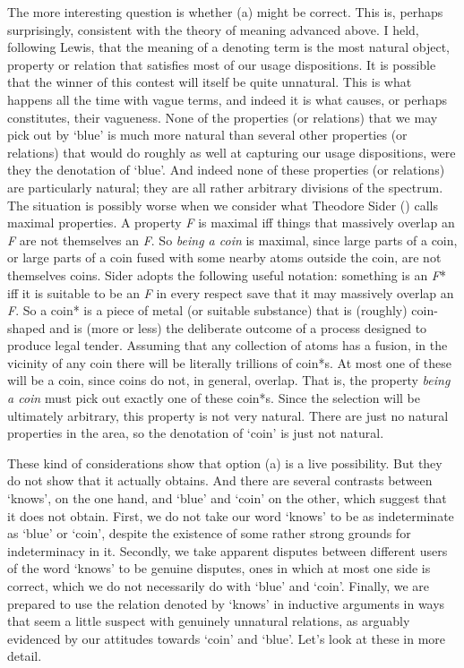\documentclass[
  11pt,
  letterpaper,
  DIV=11,
  numbers=noendperiod,
  oneside]{scrartcl}
\begin{document}
The more interesting question is whether (a) might be correct. This is,
perhaps surprisingly, consistent with the theory of meaning advanced
above. I held, following Lewis, that the meaning of a denoting term is
the most natural object, property or relation that satisfies most of our
usage dispositions. It is possible that the winner of this contest will
itself be quite unnatural. This is what happens all the time with vague
terms, and indeed it is what causes, or perhaps constitutes, their
vagueness. None of the properties (or relations) that we may pick out by
`blue' is much more natural than several other properties (or relations)
that would do roughly as well at capturing our usage dispositions, were
they the denotation of `blue'. And indeed none of these properties (or
relations) are particularly natural; they are all rather arbitrary
divisions of the spectrum. The situation is possibly worse when we
consider what Theodore Sider ()
calls maximal properties. A property \emph{F} is maximal iff things that
massively overlap an \emph{F} are not themselves an \emph{F}. So
\emph{being a coin} is maximal, since large parts of a coin, or large
parts of a coin fused with some nearby atoms outside the coin, are not
themselves coins. Sider adopts the following useful notation: something
is an \emph{F}* iff it is suitable to be an \emph{F} in every respect
save that it may massively overlap an \emph{F}. So a coin* is a piece of
metal (or suitable substance) that is (roughly) coin-shaped and is (more
or less) the deliberate outcome of a process designed to produce legal
tender. Assuming that any collection of atoms has a fusion, in the
vicinity of any coin there will be literally trillions of coin*s. At
most one of these will be a coin, since coins do not, in general,
overlap. That is, the property \emph{being a coin} must pick out exactly
one of these coin*s. Since the selection will be ultimately arbitrary,
this property is not very natural. There are just no natural properties
in the area, so the denotation of `coin' is just not natural.

These kind of considerations show that option (a) is a live possibility.
But they do not show that it actually obtains. And there are several
contrasts between `knows', on the one hand, and `blue' and `coin' on the
other, which suggest that it does not obtain. First, we do not take our
word `knows' to be as indeterminate as `blue' or `coin', despite the
existence of some rather strong grounds for indeterminacy in it.
Secondly, we take apparent disputes between different users of the word
`knows' to be genuine disputes, ones in which at most one side is
correct, which we do not necessarily do with `blue' and `coin'. Finally,
we are prepared to use the relation denoted by `knows' in inductive
arguments in ways that seem a little suspect with genuinely unnatural
relations, as arguably evidenced by our attitudes towards `coin' and
`blue'. Let's look at these in more detail.
\end{document}
